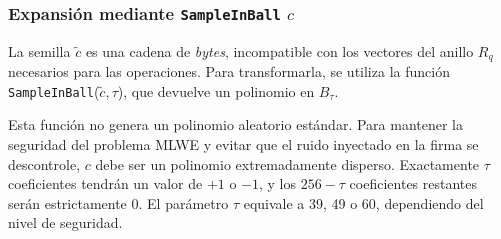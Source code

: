 \documentclass[11pt, a4paper]{report}
\theoremstyle{definition}
\begin{document}
\subsubsection{Expansión mediante \texttt{SampleInBall} $c$}
La semilla $\tilde{c}$ es una cadena de \textit{bytes}, incompatible con los vectores del anillo $R_q$ necesarios para las operaciones. Para transformarla, se utiliza la función \texttt{SampleInBall}($\tilde{c}, \tau$), que devuelve un polinomio en $B_\tau$.

Esta función no genera un polinomio aleatorio estándar. Para mantener la seguridad del problema MLWE y evitar que el ruido inyectado en la firma se descontrole, $c$ debe ser un polinomio extremadamente disperso. Exactamente $\tau$ coeficientes tendrán un valor de $+1$ o $-1$, y los $256 - \tau$ coeficientes restantes serán estrictamente $0$. El parámetro $\tau$ equivale a 39, 49 o 60, dependiendo del nivel de seguridad.
\end{document}
